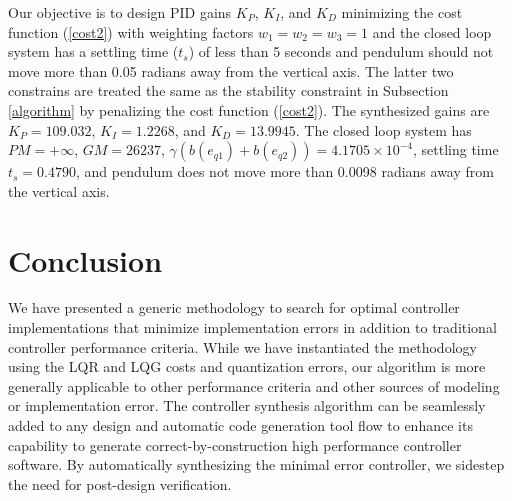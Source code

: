 \documentclass{amsart}
\numberwithin{equation}{section}
\begin{document}
Our objective is to design PID gains $K_P$, $K_I$, and $K_D$ minimizing the cost function (\ref{cost2}) with weighting factors $w_1=w_2=w_3=1$ and the closed loop system has a settling time ($t_s$) of less than 5 seconds and pendulum should not move more than 0.05 radians away from the vertical axis. The latter two constrains are treated the same as the stability constraint in Subsection \ref{algorithm} by penalizing the cost function (\ref{cost2}). The synthesized gains are $K_P=109.032$, $K_I=1.2268$, and $K_D=13.9945$. The closed loop system has $PM=+\infty$, $GM=26237$, $\gamma(b(e_{q1})+b(e_{q2}))=4.1705\times10^{-4}$, settling time $t_s=0.4790$, and pendulum does not move more than 0.0098 radians away from the vertical axis.

\section{Conclusion}

We have presented a generic methodology to search for optimal controller implementations that
minimize implementation errors in addition to traditional controller performance criteria.
While we have instantiated the methodology using the LQR and LQG costs and quantization errors, our algorithm
is more generally applicable to other performance criteria and other sources of modeling or implementation error.
The controller synthesis algorithm can be seamlessly added to any design and automatic code generation tool flow
to enhance its capability to generate correct-by-construction high performance controller software. 
By automatically synthesizing the minimal error controller, we sidestep the need for post-design verification.



\end{document}
